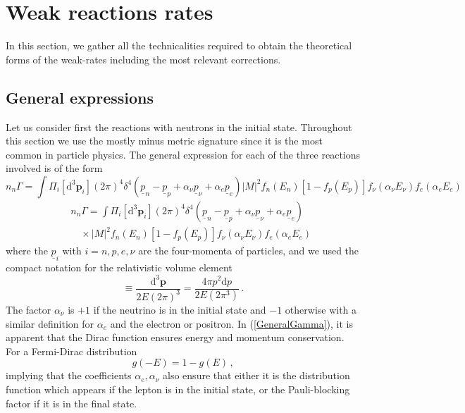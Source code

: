 \documentclass[onecolumn,float,floatfix,preprintnumbers,aps,rmp,nofootinbib,amsmath,amssymb,amsfonts,superscriptaddress,tightenlines]{revtex4}
\newcommand{\be}{\begin{equation}}
\newcommand{\ee}{\end{equation}}
\newcommand{\bea}{\begin{eqnarray}}
\newcommand{\eea}{\end{eqnarray}}
\newcommand{\fourp}[1]{\underline{#1}}
\newcommand{\gr}[1]{\mathbf{#1}}
\newcommand{\dd}{\mathrm{d}}
\newcommand{\coeffa}{\alpha}
\begin{document}
\section{Weak reactions rates}\label{Apprates}

In this section, we gather all the technicalities required to obtain
the theoretical forms of the weak-rates including the most relevant
corrections.

\subsection{General expressions}\label{AppWeakGeneralExpressions}

Let us consider first the reactions with neutrons in the initial
state. Throughout this section we use the mostly minus metric
signature since it is the most common in particle physics. The general
expression for each of the three reactions involved is of the form~\cite{Lopez1997,Fidler:2017pkg}
\ifphysrep
\be\label{GeneralGamma}
n_n \Gamma = \int \Pi_{i} [\dd^3 \gr{p}_i] 
(2\pi)^4 \delta^4\left(\fourp{p}_n -\fourp{p}_p+\coeffa_\nu {\fourp{p}}_\nu +\coeffa_e \fourp{p}_e\right) \left| M\right|^2  f_n({E}_n) [1-f_p({E}_p)] f_\nu(\coeffa_\nu {E}_\nu)
f_e(\coeffa_e {E}_e)
\ee
\else
\bea\label{GeneralGamma}
&&n_n \Gamma = \int \Pi_{i} [\dd^3 \gr{p}_i] 
(2\pi)^4 \delta^4\left(\fourp{p}_n -\fourp{p}_p+\coeffa_\nu {\fourp{p}}_\nu +\coeffa_e \fourp{p}_e\right) \nonumber\\
&&\quad\times \left| M\right|^2  f_n({E}_n) [1-f_p({E}_p)] f_\nu(\coeffa_\nu {E}_\nu)
f_e(\coeffa_e {E}_e)
\eea
\fi
where the $\fourp{p}_i$ with $i=n,p,e,\nu$ are the four-momenta of
particles, and we used the compact notation for the relativistic volume element
\be
[\dd^3 \gr{p}]\equiv\frac{\dd^3 \gr{p}}{2 E (2\pi)^3} = \frac{4\pi p^2
\dd p}{2 E (2\pi^3)}\,.
\ee
The factor $\coeffa_\nu$ is $+1$ if the neutrino is in the initial
state and $-1$ otherwise with a similar definition for $\coeffa_e$ and
the electron or positron. In (\ref{GeneralGamma}), it is apparent that the Dirac function ensures energy and momentum
conservation. For a Fermi-Dirac distribution 
\be
g(-E) = 1-g(E)\,,
\ee
implying that the coefficients $\coeffa_e,\coeffa_\nu$ also ensure that
either it is the distribution function which appears if the lepton is
in the initial state, or the Pauli-blocking factor if it is in the
final state.
\end{document}
